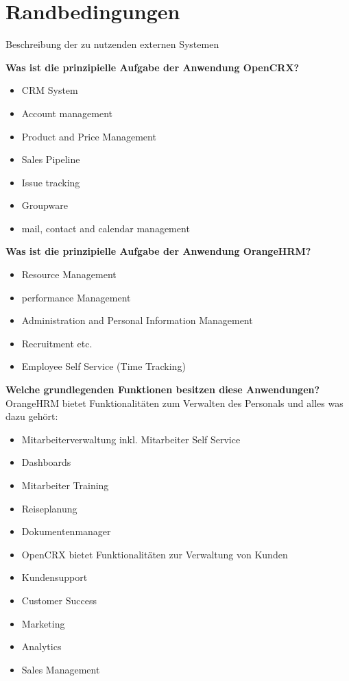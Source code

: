 \documentclass[]{article}
\begin{document}
\hypertarget{section-architecture-constraints}{%
\section{Randbedingungen}\label{section-architecture-constraints}}

Beschreibung der zu nutzenden externen Systemen

\textbf{Was ist die prinzipielle Aufgabe der Anwendung OpenCRX? }
\begin{itemize}
\item CRM System
\item Account management
\item Product and Price Management
\item Sales Pipeline
\item Issue tracking
\item Groupware
\item mail, contact and calendar management
\end{itemize}

\textbf{Was ist die prinzipielle Aufgabe der Anwendung OrangeHRM? }
\begin{itemize}
	\item Resource Management
	\item performance Management
	\item  Administration and Personal Information Management
	\item  Recruitment etc.
	\item  Employee Self Service (Time Tracking)
\end{itemize}

\textbf{Welche grundlegenden Funktionen besitzen diese Anwendungen?}
OrangeHRM bietet Funktionalitäten zum Verwalten des Personals und alles was dazu gehört:
\begin{itemize}
	\item Mitarbeiterverwaltung inkl. Mitarbeiter Self Service
	\item Dashboards
	\item Mitarbeiter Training
	\item Reiseplanung
	\item Dokumentenmanager
	\item OpenCRX bietet Funktionalitäten zur Verwaltung von Kunden
	\item Kundensupport
	\item Customer Success
	\item Marketing
	\item Analytics
	\item Sales Management
\end{itemize}
\end{document}
